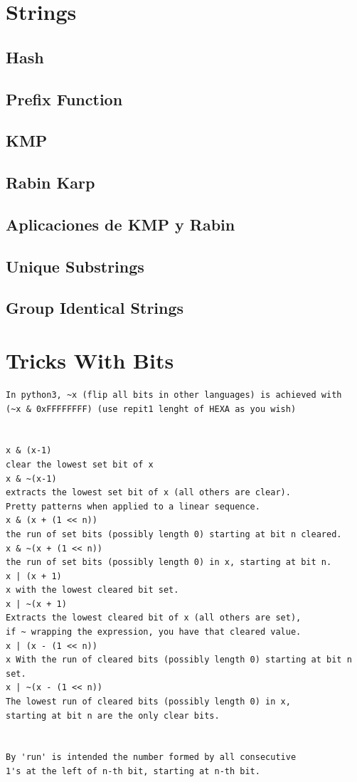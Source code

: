 \newpage
\section{Strings}
\subsection{Hash}
\subsection{Prefix Function}
\subsection{KMP}
\subsection{Rabin Karp}
\subsection{Aplicaciones de KMP y Rabin}
\subsection{Unique Substrings}
\subsection{Group Identical Strings}
\newpage
\section{Tricks With Bits}
\begin{verbatim}
In python3, ~x (flip all bits in other languages) is achieved with
(~x & 0xFFFFFFFF) (use repit1 lenght of HEXA as you wish)


x & (x-1)
clear the lowest set bit of x
x & ~(x-1)
extracts the lowest set bit of x (all others are clear).
Pretty patterns when applied to a linear sequence.
x & (x + (1 << n))
the run of set bits (possibly length 0) starting at bit n cleared.
x & ~(x + (1 << n))
the run of set bits (possibly length 0) in x, starting at bit n.
x | (x + 1)
x with the lowest cleared bit set.
x | ~(x + 1)
Extracts the lowest cleared bit of x (all others are set),
if ~ wrapping the expression, you have that cleared value.
x | (x - (1 << n))
x With the run of cleared bits (possibly length 0) starting at bit n set.
x | ~(x - (1 << n))
The lowest run of cleared bits (possibly length 0) in x,
starting at bit n are the only clear bits.


By 'run' is intended the number formed by all consecutive
1's at the left of n-th bit, starting at n-th bit.
\end{verbatim}

